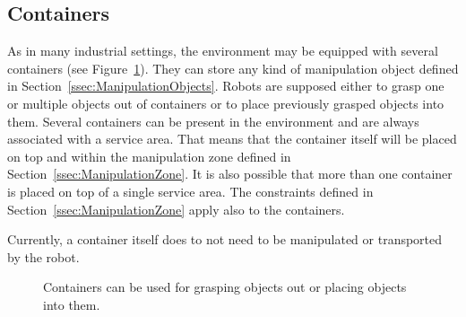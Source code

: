 \subsection{Containers}
As in many industrial settings, the \RCAW environment may be equipped with several containers (see Figure~\ref{fig:containers}). They can store any kind of manipulation object defined in Section~\ref{ssec:ManipulationObjects}. Robots are supposed either to grasp one or multiple objects out of containers or to place previously grasped objects into them. Several containers can be present in the environment and are always associated with a service area. That means that the container itself will be placed on top and within the manipulation zone defined in Section~\ref{ssec:ManipulationZone}.
It is also possible that more than one container is placed on top of a single service area.
The constraints defined in Section~\ref{ssec:ManipulationZone} apply also to the containers.

Currently, a container itself does to not need to be manipulated or transported by the robot.

\begin{figure} [h!]
\begin{center}
 \hspace{1cm}
\end{center}
\caption{Containers can be used for grasping objects out or placing objects into them.}
\label{fig:containers}
\end{figure}


